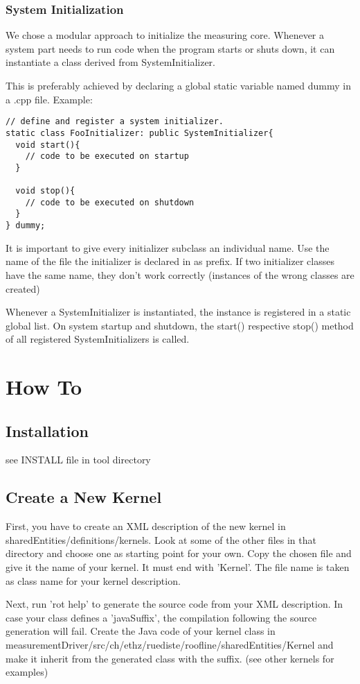 \documentclass[a4paper,12pt]{article}
\begin{document}
\subsubsection{System Initialization}
We chose a modular approach to initialize the measuring core. Whenever a system
part needs to run code when the program starts or shuts down, it can instantiate
a class derived from SystemInitializer.

This is preferably achieved by declaring a global static variable named dummy
in a .cpp file. Example:
\begin{verbatim}
// define and register a system initializer.
static class FooInitializer: public SystemInitializer{
  void start(){
    // code to be executed on startup
  }

  void stop(){
    // code to be executed on shutdown
  }
} dummy;
\end{verbatim}

It is important to give every initializer subclass an individual name. Use the
name of the file the initializer is declared in as prefix. If two initializer
classes have the same name, they don't work correctly (instances of the wrong
classes are created)

Whenever a SystemInitializer is instantiated, the instance is registered in a
static global list. On system startup and shutdown, the start() respective
stop() method of all registered SystemInitializers is called.

\section{How To}
\subsection{Installation}
see INSTALL file in tool directory

\subsection{Create a New Kernel}
First, you have to create an XML description of the new kernel in
sharedEntities/definitions/kernels. Look at some of the other files in that
directory and choose one as starting point for your own. Copy the chosen file
and give it the name of your kernel. It must end with 'Kernel'. The file name is
taken as class name for your kernel description.

Next, run 'rot help' to generate the source code from your XML description. In
case your class defines a 'javaSuffix', the compilation following the source
generation will fail. Create the Java code of your kernel class in
measurementDriver/src/ch/ethz/ruediste/roofline/sharedEntities/Kernel and make
it inherit from the generated class with the suffix. (see other kernels for
examples)
\end{document}
